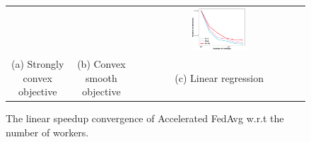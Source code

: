 \begin{figure}
\centering
\begin{tabular}{ccc}
 &  & 
\includegraphics[width=0.33\textwidth]{fig/paper-lrnesterovspeedupNodesT-min-linearregressionw8a-epsilon002-reg0.pdf}\\
(a) Strongly convex objective & (b) Convex smooth objective & (c) Linear regression
	\end{tabular}
\caption{The linear speedup convergence of Accelerated FedAvg w.r.t the number of workers. }
\label{fig:nesterov}
\end{figure}

